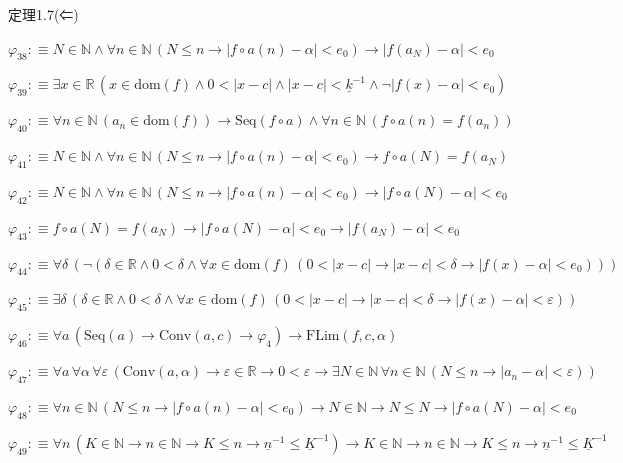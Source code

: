 \begin{fullproof}{定理1.7(⇐)}
\begin{abbrevlist}
\item $\varphi_{38} :\equiv N \in \mathbb{N} \land \forall n \in \mathbb{N}\,(N \leq n \to \lvert f \circ a(n) - \alpha \rvert < e_{0}) \to \lvert f(a_{N}) - \alpha \rvert < e_{0}$
\item $\varphi_{39} :\equiv \exists x \in \mathbb{R}\,(x \in \mathrm{dom}(f) \land 0 < \lvert x - c \rvert \land \lvert x - c \rvert < \underline{k}^{-1} \land \neg \lvert f(x) - \alpha \rvert < e_{0})$
\item $\varphi_{40} :\equiv \forall n \in \mathbb{N}\,(a_{n} \in \mathrm{dom}(f)) \to \mathrm{Seq}(f \circ a) \land \forall n \in \mathbb{N}\,(f \circ a(n) = f(a_{n}))$
\item $\varphi_{41} :\equiv N \in \mathbb{N} \land \forall n \in \mathbb{N}\,(N \leq n \to \lvert f \circ a(n) - \alpha \rvert < e_{0}) \to f \circ a(N) = f(a_{N})$
\item $\varphi_{42} :\equiv N \in \mathbb{N} \land \forall n \in \mathbb{N}\,(N \leq n \to \lvert f \circ a(n) - \alpha \rvert < e_{0}) \to \lvert f \circ a(N) - \alpha \rvert < e_{0}$
\item $\varphi_{43} :\equiv f \circ a(N) = f(a_{N}) \to \lvert f \circ a(N) - \alpha \rvert < e_{0} \to \lvert f(a_{N}) - \alpha \rvert < e_{0}$
\item $\varphi_{44} :\equiv \forall \delta\,(\neg (\delta \in \mathbb{R} \land 0 < \delta \land \forall x \in \mathrm{dom}(f)\,(0 < \lvert x - c \rvert \to \lvert x - c \rvert < \delta \to \lvert f(x) - \alpha \rvert < e_{0})))$
\item $\varphi_{45} :\equiv \exists \delta\,(\delta \in \mathbb{R} \land 0 < \delta \land \forall x \in \mathrm{dom}(f)\,(0 < \lvert x - c \rvert \to \lvert x - c \rvert < \delta \to \lvert f(x) - \alpha \rvert < \varepsilon))$
\item $\varphi_{46} :\equiv \forall a\,(\mathrm{Seq}(a) \to \mathrm{Conv}(a,c) \to \varphi_{4}) \to \mathrm{FLim}(f,c,\alpha)$
\item $\varphi_{47} :\equiv \forall a\,\forall \alpha\,\forall \varepsilon\,(\mathrm{Conv}(a,\alpha) \to \varepsilon \in \mathbb{R} \to 0 < \varepsilon \to \exists N \in \mathbb{N}\,\forall n \in \mathbb{N}\,(N \leq n \to \lvert a_{n} - \alpha \rvert < \varepsilon))$
\item $\varphi_{48} :\equiv \forall n \in \mathbb{N}\,(N \leq n \to \lvert f \circ a(n) - \alpha \rvert < e_{0}) \to N \in \mathbb{N} \to N \leq N \to \lvert f \circ a(N) - \alpha \rvert < e_{0}$
\item $\varphi_{49} :\equiv \forall n\,(K \in \mathbb{N} \to n \in \mathbb{N} \to K \leq n \to \underline{n}^{-1} \leq \underline{K}^{-1}) \to K \in \mathbb{N} \to n \in \mathbb{N} \to K \leq n \to \underline{n}^{-1} \leq \underline{K}^{-1}$

\end{abbrevlist}
\end{fullproof}
